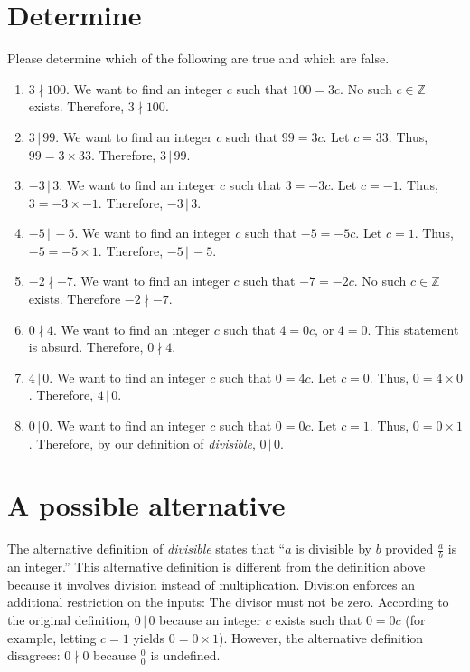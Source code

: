 \documentclass[12pt]{article}
\begin{document}
\section{Determine}
Please determine which of the following are true and which are false.
\begin{enumerate}
    \item$3\nmid 100$. We want to find an integer $c$ such that $100=3c$. No such $c\in\mathbb{Z}$ exists. Therefore, $3\nmid 100$.
    \item$3\,|\,99$. We want to find an integer $c$ such that $99=3c$. Let $c=33$. Thus, $99=3\times 33$. Therefore, $3\,|\,99$.
    \item$-3\,|\,3$. We want to find an integer $c$ such that $3=-3c$. Let $c=-1$. Thus, $3=-3\times-1$. Therefore, $-3\,|\,3.$
    \item$-5\,|\,-5$. We want to find an integer $c$ such that $-5=-5c$. Let $c=1$. Thus, $-5=-5\times 1$. Therefore, $-5\,|\,-5.$
    \item$-2\nmid-7$. We want to find an integer $c$ such that $-7=-2c$. No such $c\in\mathbb{Z}$ exists. Therefore $-2\nmid -7$.
    \item$0\nmid 4$. We want to find an integer $c$ such that $4=0c$, or $4=0$. This statement is absurd. Therefore, $0\nmid 4$.
    \item$4\,|\,0$. We want to find an integer $c$ such that $0=4c$. Let $c=0$. Thus, $0=4\times 0$. Therefore, $4\,|\,0$.
    \item$0\,|\,0$. We want to find an integer $c$ such that $0=0c$. Let $c=1$. Thus, $0=0\times 1$. Therefore, by our definition of \textit{divisible}, $0\,|\,0$.
\end{enumerate}
\section{A possible alternative}
The alternative definition of \textit{divisible} states that ``$a$ is divisible by $b$ provided $\frac{a}{b}$ is an integer.'' This alternative definition is different from the definition above because it involves division instead of multiplication. Division enforces an additional restriction on the inputs: The divisor must not be zero. According to the original definition, $0\,|\,0$ because an integer $c$ exists such that $0=0c$ (for example, letting $c=1$ yields $0=0\times 1$). However, the alternative definition disagrees: $0\nmid 0$ because $\frac{0}{0}$ is undefined.
\end{document}
